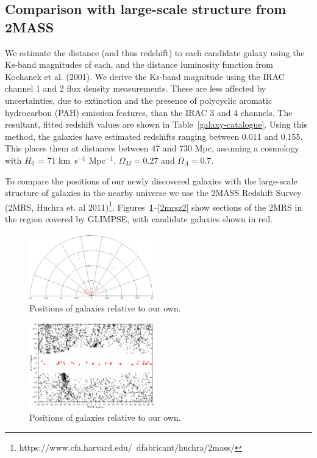 \documentclass[times,usenatbib]{mn2e}
\begin{document}
\subsection{Comparison with large-scale structure from 2MASS}

We estimate the distance (and thus redshift) to each candidate galaxy using the Ks-band magnitudes of each, and the distance luminosity function from Kochanek et al. (2001). We derive the Ks-band magnitude using the IRAC channel 1 and 2 flux density measurements. These are less affected by uncertainties, due to extinction and the presence of polycyclic aromatic hydrocarbon (PAH) emission features, than the IRAC 3 and 4 channels. The resultant, fitted redshift values are shown in Table~\ref{galaxy-catalogue}. Using this method, the galaxies have estimated redshifts ranging between 0.011 and 0.155. This places them at distances between 47 and 730 Mpc, assuming a cosmology with $H_{0}$ = 71 km~s$^{-1}$ Mpc$^{-1}$, $\Omega_{M}=0.27$ and $\Omega_{\Lambda}=0.7$.

To compare the positions of our newly discovered galaxies with the large-scale structure of galaxies in the nearby universe we use the 2MASS Redshift Survey (2MRS, Huchra et. al 2011)\footnote{https://www.cfa.harvard.edu/~dfabricant/huchra/2mass/}. Figures~\ref{polar}--\ref{2mrsz2} show sections of the 2MRS in the region covered by GLIMPSE, with candidate galaxies shown in red.

\begin{figure}
\includegraphics[width=0.48\textwidth]{./figures/polar.eps}
\caption{Positions of galaxies relative to our own.}
\label{polar}
\end{figure}

\begin{figure}
\includegraphics[width=0.48\textwidth]{./figures/2MRS_latlon.eps}
\caption{Positions of galaxies relative to our own.}
\label{2mrs}
\end{figure}
\end{document}
